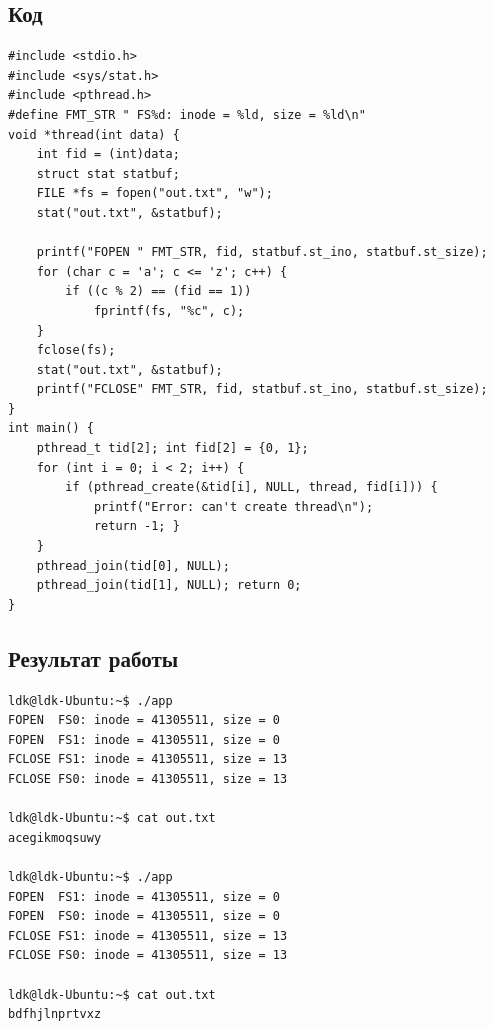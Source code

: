 \documentclass[12pt]{report}
\begin{document}
\subsection*{Код}
\begin{lstlisting}
#include <stdio.h>
#include <sys/stat.h>
#include <pthread.h>
#define FMT_STR " FS%d: inode = %ld, size = %ld\n"
void *thread(int data) {
    int fid = (int)data;
    struct stat statbuf;
    FILE *fs = fopen("out.txt", "w");
    stat("out.txt", &statbuf);

    printf("FOPEN " FMT_STR, fid, statbuf.st_ino, statbuf.st_size);
    for (char c = 'a'; c <= 'z'; c++) {
        if ((c % 2) == (fid == 1))
            fprintf(fs, "%c", c);
    }
    fclose(fs);
    stat("out.txt", &statbuf);
    printf("FCLOSE" FMT_STR, fid, statbuf.st_ino, statbuf.st_size);
}
int main() {
    pthread_t tid[2]; int fid[2] = {0, 1};
    for (int i = 0; i < 2; i++) {
        if (pthread_create(&tid[i], NULL, thread, fid[i])) {
            printf("Error: can't create thread\n");
            return -1; }
    }
    pthread_join(tid[0], NULL);
    pthread_join(tid[1], NULL); return 0;
}
\end{lstlisting}

\subsection*{Результат работы}
\begin{lstlisting}
ldk@ldk-Ubuntu:~$ ./app
FOPEN  FS0: inode = 41305511, size = 0
FOPEN  FS1: inode = 41305511, size = 0
FCLOSE FS1: inode = 41305511, size = 13
FCLOSE FS0: inode = 41305511, size = 13

ldk@ldk-Ubuntu:~$ cat out.txt
acegikmoqsuwy

ldk@ldk-Ubuntu:~$ ./app
FOPEN  FS1: inode = 41305511, size = 0
FOPEN  FS0: inode = 41305511, size = 0
FCLOSE FS1: inode = 41305511, size = 13
FCLOSE FS0: inode = 41305511, size = 13

ldk@ldk-Ubuntu:~$ cat out.txt
bdfhjlnprtvxz
\end{lstlisting}
\end{document}
